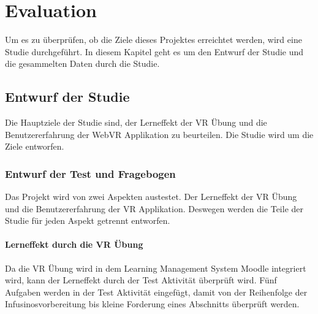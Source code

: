 \chapter{Evaluation}

Um es zu überprüfen, ob die Ziele dieses Projektes erreichtet werden, wird eine Studie durchgeführt. In diesem Kapitel geht es um den Entwurf der Studie und die gesammelten Daten durch die Studie.

\section{Entwurf der Studie}

Die Hauptziele der Studie sind, der Lerneffekt der VR Übung und die Benutzererfahrung der WebVR Applikation zu beurteilen. Die Studie wird um die Ziele entworfen.

\subsection{Entwurf der Test und Fragebogen}

Das Projekt wird von zwei Aspekten austestet. Der Lerneffekt der VR Übung und die Benutzererfahrung der VR Applikation. Deswegen werden die Teile der Studie für jeden Aspekt getrennt entworfen.

\subsubsection{Lerneffekt durch die VR Übung}

Da die VR Übung wird in dem Learning Management System Moodle integriert wird, kann der Lerneffekt durch der Test Aktivität überprüft wird. Fünf Aufgaben werden in der Test Aktivität eingefügt, damit von der Reihenfolge der Infusinosvorbereitung bis kleine Forderung eines Abschnitts überprüft werden.

